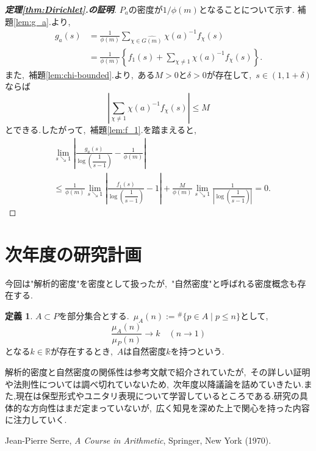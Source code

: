 \documentclass[uplatex,12pt]{jsarticle}
\numberwithin{equation}{section}
\theoremstyle{definition}
\newtheorem{definition}{定義}[section]
\newcommand{\dsum}{\displaystyle\sum}
\begin{document}
\begin{proof}[\bf{定理\ref{thm:Dirichlet}.の証明}]
$P_a$の密度が$1/\phi(m)$となることについて示す.
補題\ref{lem:g_a}.より,
\begin{align}
g_a(s) &= \frac{1}{\phi(m)}\sum_{\chi\in\widehat{G(m)}}\chi(a)^{-1}f_\chi(s) \\
       &= \frac{1}{\phi(m)}\left\{f_1(s)+\sum_{\chi\ne1}\chi(a)^{-1}f_\chi(s)\right\}.
\end{align}
また,\ 補題\ref{lem:chi-bounded}.より,\ ある$M>0$と$\delta>0$が存在して,\ $s\in(1,1+\delta)$ならば
\begin{equation}
	\left|\dsum_{\chi\ne1}\chi(a)^{-1}f_\chi(s)\right|\leq M
\end{equation}
とできる.したがって,\ 補題\ref{lem:f_1}.を踏まえると,
\begin{align}
&\lim_{s\searrow1}\left|\frac{g_a(s)}{\log\left(\dfrac{1}{s-1}\right)}-\frac{1}{\phi(m)}\right| \\
&\leq \frac{1}{\phi(m)}\lim_{s\searrow1}\left|\frac{f_1(s)}{\log\left(\dfrac{1}{s-1}\right)}-1\right|+\frac{M}{\phi(m)}\lim_{s\searrow1}\frac{1}{\left|\log\left(\dfrac{1}{s-1}\right)\right|} =0.
\end{align}

\end{proof}



\section{次年度の研究計画}

今回は"解析的密度"を密度として扱ったが,\ "自然密度"と呼ばれる密度概念も存在する.

\begin{definition}
$A\subset P$を部分集合とする.\ $\mu_A(n):={}^\#\{p\in A\mid p\leq n\}$として,
\begin{equation}
	\frac{\mu_A(n)}{\mu_P(n)}\rightarrow k \quad(n\to1)
\end{equation}
となる$k\in\mathbb{R}$が存在するとき,\ $A$は自然密度$k$を持つという.
\end{definition}
解析的密度と自然密度の関係性は参考文献で紹介されていたが,\ その詳しい証明や法則性については調べ切れていないため,\ 次年度以降議論を詰めていきたい.また,現在は保型形式やユニタリ表現について学習しているところである.研究の具体的な方向性はまだ定まっていないが,\ 広く知見を深めた上で関心を持った内容に注力していく.

\begin{thebibliography}{99}

 Jean-Pierre Serre, \textit{A Course in Arithmetic}, Springer, New York (1970).


\end{thebibliography}
\end{document}
